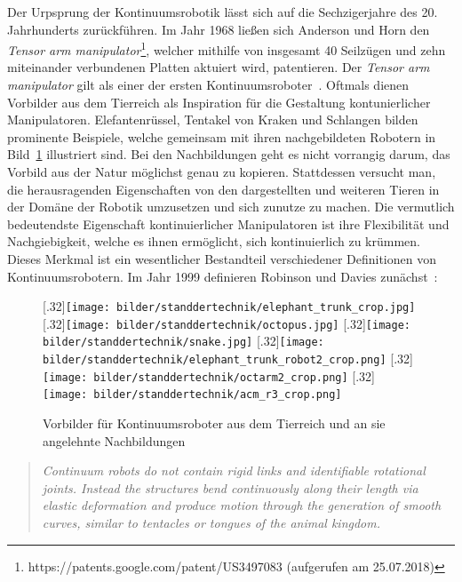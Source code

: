 Der Urpsprung der Kontinuumsrobotik lässt sich auf die Sechzigerjahre des 20. Jahrhunderts zurückführen. Im Jahr 1968 ließen sich Anderson und Horn den \textit{Tensor arm manipulator}\footnote{https://patents.google.com/patent/US3497083 (aufgerufen am 25.07.2018)}, welcher mithilfe von insgesamt 40 Seilzügen und zehn miteinander verbundenen Platten aktuiert wird, patentieren. Der \textit{Tensor arm manipulator} gilt als einer der ersten Kontinuumsroboter~\cite{Wal13}. Oftmals dienen Vorbilder aus dem Tierreich als Inspiration für die Gestaltung kontunierlicher Manipulatoren. Elefantenrüssel, Tentakel von Kraken und Schlangen bilden prominente Beispiele, welche gemeinsam mit ihren nachgebildeten Robotern in Bild~\ref{fig:tiereUndRoboter} illustriert sind. Bei den Nachbildungen geht es nicht vorrangig darum, das Vorbild aus der Natur möglichst genau zu kopieren. Stattdessen versucht man, die herausragenden Eigenschaften von den dargestellten und weiteren Tieren in der Domäne der Robotik umzusetzen und sich zunutze zu machen. Die vermutlich bedeutendste Eigenschaft kontinuierlicher Manipulatoren ist ihre Flexibilität und Nachgiebigkeit, welche es ihnen ermöglicht, sich kontinuierlich zu krümmen. Dieses Merkmal ist ein wesentlicher Bestandteil verschiedener Definitionen von Kontinuumsrobotern. Im Jahr 1999 definieren Robinson und Davies zunächst~\cite{RD99}:
%
\begin{figure}[t]
\centering
{}%
[.32\linewidth]{\texttt{[image: bilder/standdertechnik/elephant\_trunk\_crop.jpg]}}
%
[.32\linewidth]{\texttt{[image: bilder/standdertechnik/octopus.jpg]}}
[.32\linewidth]{\texttt{[image: bilder/standdertechnik/snake.jpg]}}
\medskip
{}%
[.32\linewidth]{\texttt{[image: bilder/standdertechnik/elephant\_trunk\_robot2\_crop.png]}}
%
[.32\linewidth]{\texttt{[image: bilder/standdertechnik/octarm2\_crop.png]}}
[.32\linewidth]{\texttt{[image: bilder/standdertechnik/acm\_r3\_crop.png]}}
\caption[Vorbilder für Kontinuumsroboter aus dem Tierreich und an sie angelehnte Nachbildungen]{Vorbilder für Kontinuumsroboter aus dem Tierreich und an sie angelehnte Nachbildungen}
\label{fig:tiereUndRoboter}
\end{figure}

\begin{quotation}
\textit{Continuum robots do not contain rigid links and identifiable rotational joints. Instead the structures bend continuously along their length via elastic deformation and produce motion through the generation of smooth curves, similar to tentacles or tongues of the animal kingdom.}
\end{quotation}

